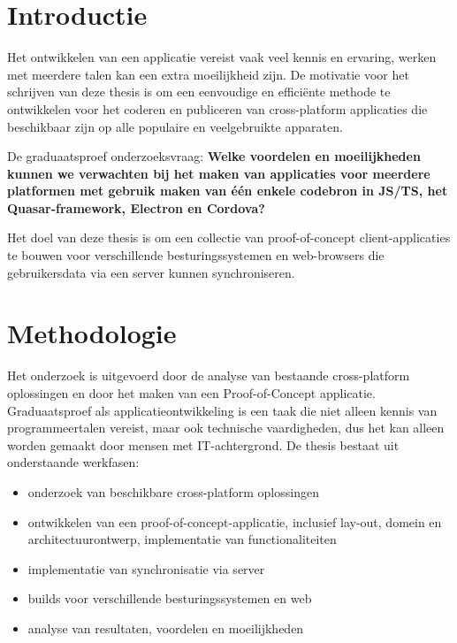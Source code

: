 \documentclass[a0,portrait]{hogent-poster}
\begin{document}
\begin{multicols}{2} %

\section{Introductie}

Het ontwikkelen van een applicatie vereist vaak veel kennis en ervaring, werken met meerdere talen kan een extra moeilijkheid zijn.
De motivatie voor het schrijven van deze thesis is om een eenvoudige en efficiënte methode te ontwikkelen voor het coderen en publiceren van cross-platform applicaties die beschikbaar zijn op alle populaire en veelgebruikte apparaten.\newline

De graduaatsproef onderzoeksvraag:
\textbf{Welke voordelen en moeilijkheden kunnen we verwachten bij het maken van applicaties voor meerdere platformen met gebruik maken van één enkele codebron in JS/TS, het Quasar-framework, Electron en Cordova? }

Het doel van deze thesis is om een collectie van proof-of-concept client-applicaties te bouwen voor verschillende besturingssystemen en web-browsers die gebruikersdata via een server kunnen synchroniseren.

\section{Methodologie}
Het onderzoek is uitgevoerd door de analyse van bestaande cross-platform oplossingen en door het maken van een Proof-of-Concept applicatie. Graduaatsproef als applicatieontwikkeling is een taak die niet alleen kennis van programmeertalen vereist, maar ook technische vaardigheden, dus het kan alleen worden gemaakt door mensen met IT-achtergrond. De thesis bestaat uit onderstaande werkfasen:
\begin{itemize}
    \item onderzoek van beschikbare cross-platform oplossingen
    \item ontwikkelen van een proof-of-concept-applicatie, inclusief lay-out, domein en architectuurontwerp, implementatie van functionaliteiten
    \item implementatie van synchronisatie via server
    \item builds voor verschillende besturingssystemen en web
    \item analyse van resultaten, voordelen en moeilijkheden
\end{itemize}


\end{multicols}
\end{document}
